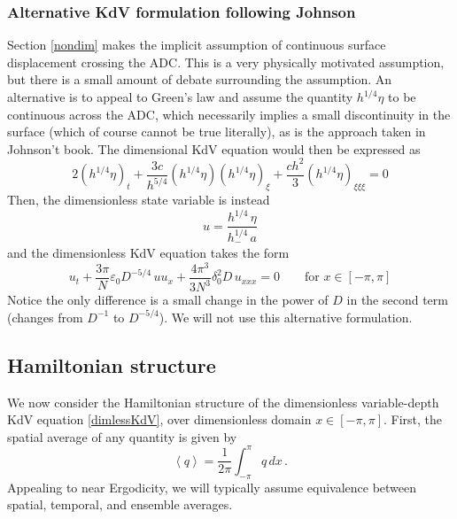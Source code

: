 \documentclass[11pt]{article}
\newcommand{\mean}[1]{\left< #1 \right>}
\newcommand{\eps}{\varepsilon}
\newcommand{\depth}{h}
\newcommand{\dup}{\depth_{-}}
\newcommand{\freqp}{f_p}
\newcommand{\lam}{\lambda}
\newcommand{\lamfac}{N}
\newcommand{\amp}{a}
\newcommand{\epsup}{\eps_0}
\newcommand{\delup}{\delta_0}
\newcommand{\drat}{D}
\newcommand{\dx}{\, dx}
\begin{document}
\begin{comment}
{\bf Sidenote}: In the case of constant depth, if one simply uses the most naive scales, $u = \eta/\amp$, $\tilde{x} = \xi/\lam$, $\tilde{t} = t \freqp$, then the dimensionless KdV is the more standard one:
\begin{equation}
2 u_t + 3 \eps u u_x + \frac{\delta^2}{3} u_{xxx} = 0
\end{equation}
where $\eps = a/h$ and $\delta = h/\lam$.
\end{comment}


\subsubsection{Alternative KdV formulation following Johnson}
Section \ref{nondim} makes the implicit assumption of continuous surface displacement crossing the ADC. This is a very physically motivated assumption, but there is a small amount of debate surrounding the assumption. An alternative is to appeal to Green's law and assume the quantity $\depth^{1/4} \eta$ to be continuous across the ADC, which necessarily implies a small discontinuity in the surface (which of course cannot be true literally), as is the approach taken in Johnson't book. The dimensional KdV equation would then be expressed as
\begin{equation}
2 (\depth^{1/4} \eta)_t + \frac{3 c}{\depth^{5/4}} (\depth^{1/4} \eta) (\depth^{1/4} \eta)_{\xi} + \frac{c \depth^2}{3} (\depth^{1/4} \eta)_{\xi \xi \xi} = 0
\end{equation}
Then, the dimensionless state variable is instead 
\begin{equation}
u = \frac{\depth^{1/4} \, \eta}{ \dup^{1/4} \, \amp}
\end{equation}
and the dimensionless KdV equation takes the form
\begin{equation}
u_t + \frac{3 \pi}{\lamfac} \epsup \drat^{-5/4} \, u u_x + \frac{4 \pi^3}{3 \lamfac^3} \delup^2 \drat \, u_{xxx} = 0
\qquad \text{for } x \in [-\pi,\pi]
\end{equation}
Notice the only difference is a small change in the power of $\drat$ in the second term (changes from $\drat^{-1}$ to $\drat^{-5/4}$).
We will not use this alternative formulation.


\subsection{Hamiltonian structure}

We now consider the Hamiltonian structure of the dimensionless variable-depth KdV equation \eqref{dimlessKdV}, over dimensionless domain $x \in [-\pi,\pi]$. First, the spatial average of any quantity is given by
\begin{equation}
\mean{q} = \frac{1}{2\pi} \int_{-\pi}^{\pi} q \dx \, .
\end{equation}
Appealing to near Ergodicity, we will typically assume equivalence between spatial, temporal, and ensemble averages. 
\end{document}
